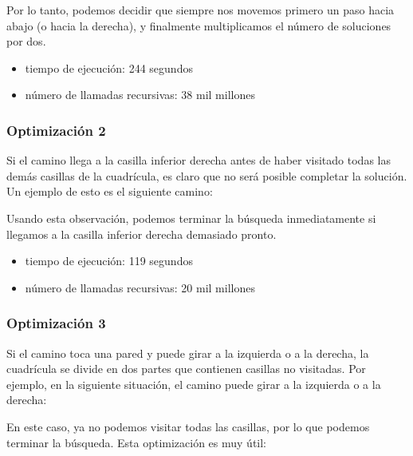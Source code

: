 Por lo tanto, podemos decidir que siempre nos movemos primero
un paso hacia abajo (o hacia la derecha),
y finalmente multiplicamos el número de soluciones por dos.

\begin{itemize}
\item
tiempo de ejecución: 244 segundos
\item
número de llamadas recursivas: 38 mil millones
\end{itemize}

\subsubsection{Optimización 2}

Si el camino llega a la casilla inferior derecha
antes de haber visitado todas las demás casillas de la cuadrícula,
es claro que
no será posible completar la solución.
Un ejemplo de esto es el siguiente camino:

\begin{center}
\end{center}
Usando esta observación, podemos terminar la búsqueda
inmediatamente si llegamos a la casilla inferior derecha demasiado pronto.
\begin{itemize}
\item
tiempo de ejecución: 119 segundos
\item
número de llamadas recursivas: 20 mil millones
\end{itemize}

\subsubsection{Optimización 3}

Si el camino toca una pared
y puede girar a la izquierda o a la derecha,
la cuadrícula se divide en dos partes
que contienen casillas no visitadas.
Por ejemplo, en la siguiente situación,
el camino puede girar a la izquierda o a la derecha:

\begin{center}
\end{center}
En este caso, ya no podemos visitar todas las casillas,
por lo que podemos terminar la búsqueda.
Esta optimización es muy útil:

